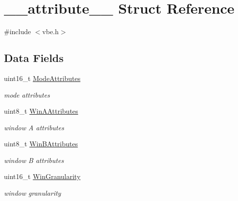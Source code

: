 \hypertarget{struct____attribute____}{}\section{\+\_\+\+\_\+attribute\+\_\+\+\_\+ Struct Reference}
\label{struct____attribute____}


{\ttfamily \#include $<$vbe.\+h$>$}

\subsection*{Data Fields}
\begin{DoxyCompactItemize}
\item 
\hypertarget{struct____attribute_____ad7593abf9d201ce5e59de60baba548cd}{}\label{struct____attribute_____ad7593abf9d201ce5e59de60baba548cd} 
uint16\+\_\+t \hyperlink{struct____attribute_____ad7593abf9d201ce5e59de60baba548cd}{Mode\+Attributes}
\begin{DoxyCompactList}\small\item\em mode attributes \end{DoxyCompactList}\item 
\hypertarget{struct____attribute_____aaa90049ea7f03763acbbf75240f4f5d8}{}\label{struct____attribute_____aaa90049ea7f03763acbbf75240f4f5d8} 
uint8\+\_\+t \hyperlink{struct____attribute_____aaa90049ea7f03763acbbf75240f4f5d8}{Win\+A\+Attributes}
\begin{DoxyCompactList}\small\item\em window A attributes \end{DoxyCompactList}\item 
\hypertarget{struct____attribute_____a370ddeb84e904ef1000fe57905ebf6b8}{}\label{struct____attribute_____a370ddeb84e904ef1000fe57905ebf6b8} 
uint8\+\_\+t \hyperlink{struct____attribute_____a370ddeb84e904ef1000fe57905ebf6b8}{Win\+B\+Attributes}
\begin{DoxyCompactList}\small\item\em window B attributes \end{DoxyCompactList}\item 
\hypertarget{struct____attribute_____a38f205f799c6929629395f03e24de077}{}\label{struct____attribute_____a38f205f799c6929629395f03e24de077} 
uint16\+\_\+t \hyperlink{struct____attribute_____a38f205f799c6929629395f03e24de077}{Win\+Granularity}
\begin{DoxyCompactList}\small\item\em window granularity \end{DoxyCompactList}\item 

\end{DoxyCompactItemize}
